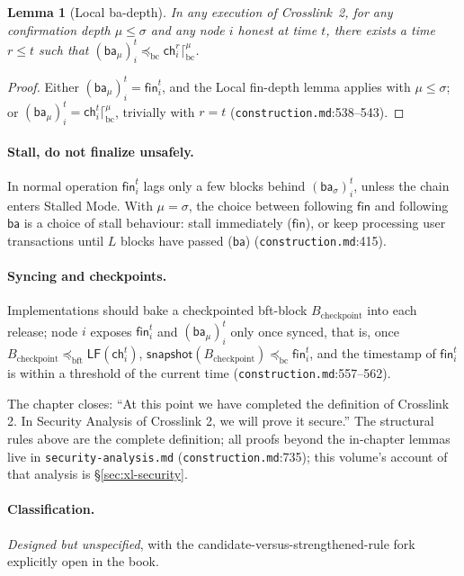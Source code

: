 \documentclass[11pt,a4paper]{article}
\newtheorem{lemma}[theorem]{Lemma}
\theoremstyle{definition}
\begin{document}
\begin{lemma}[Local ba-depth]\label{lem:xl-ba-depth}
In any execution of Crosslink~2, for any confirmation depth $\mu \le
\sigma$ and any node $i$ honest at time $t$, there exists a time $r \le
t$ such that $(\mathsf{ba}_{\mu})_i^t \preceq_{\mathrm{bc}}
\mathsf{ch}_i^r \lceil^{\mu}_{\mathrm{bc}}$.
\end{lemma}
\begin{proof}
Either $(\mathsf{ba}_{\mu})_i^t = \mathsf{fin}_i^t$, and the Local
fin-depth lemma applies with $\mu \le \sigma$; or $(\mathsf{ba}_{\mu})_i^t
= \mathsf{ch}_i^t \lceil^{\mu}_{\mathrm{bc}}$, trivially with $r = t$
(\texttt{construction.md}:538--543).
\end{proof}

\paragraph{Stall, do not finalize unsafely.} In normal operation
$\mathsf{fin}_i^t$ lags only a few blocks behind
$(\mathsf{ba}_{\sigma})_i^t$, unless the chain enters Stalled Mode. With
$\mu = \sigma$, the choice between following $\mathsf{fin}$ and following
$\mathsf{ba}$ is a choice of stall behaviour: stall immediately
($\mathsf{fin}$), or keep processing user transactions until $L$ blocks
have passed ($\mathsf{ba}$) (\texttt{construction.md}:415).

\paragraph{Syncing and checkpoints.} Implementations should bake a
checkpointed bft-block $B_{\mathrm{checkpoint}}$ into each release; node
$i$ exposes $\mathsf{fin}_i^t$ and $(\mathsf{ba}_{\mu})_i^t$ only once
synced, that is, once $B_{\mathrm{checkpoint}} \preceq_{\mathrm{bft}}
\mathsf{LF}(\mathsf{ch}_i^t)$,
$\mathsf{snapshot}(B_{\mathrm{checkpoint}}) \preceq_{\mathrm{bc}}
\mathsf{fin}_i^t$, and the timestamp of $\mathsf{fin}_i^t$ is within a
threshold of the current time (\texttt{construction.md}:557--562).

The chapter closes: ``At this point we have completed the definition of
Crosslink 2. In Security Analysis of Crosslink 2, we will prove it
secure.'' The structural rules above are the complete definition; all
proofs beyond the in-chapter lemmas live in
\texttt{security-analysis.md} (\texttt{construction.md}:735); this
volume's account of that analysis is \S\ref{sec:xl-security}.
\paragraph{Classification.} \emph{Designed but unspecified}, with the
candidate-versus-strengthened-rule fork explicitly open in the book.
\end{document}
